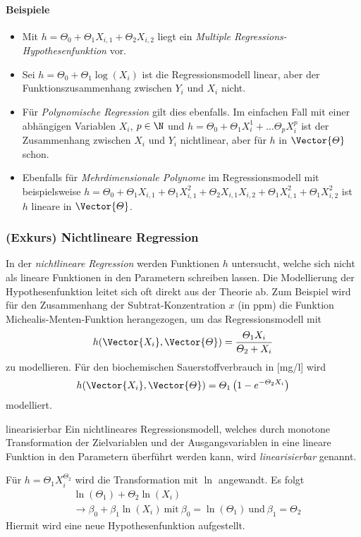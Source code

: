 \paragraph{Beispiele} 
\begin{itemize}
	\item Mit $h = \varTheta_0 + \varTheta_1X_{i,1} + \varTheta_2X_{i,2}$ liegt ein \textit{Multiple Regressions-Hypothesenfunktion} vor.
	\item Sei $h= \varTheta_0 + \varTheta_1\log(X_i)$ ist die Regressionsmodell linear, aber der Funktionszusammenhang zwischen $Y_i$ und $X_i$ nicht.
	\item Für \textit{Polynomische Regression} gilt dies ebenfalls. Im einfachen Fall mit einer abhängigen Variablen $X_i$, $p\in \N$ und $h= \varTheta_0 + \varTheta_1X_i^1+\dots \varTheta_pX_i^p$ ist der Zusammenhang zwischen $X_i$ und $Y_i$ nichtlinear, aber für $h$ in $\Vector{\varTheta}$ schon.
	\item  Ebenfalls für \textit{Mehrdimensionale Polynome} im Regressionsmodell mit beispielsweise
	$h=\varTheta_0 + \varTheta_1X_{i,1} +\varTheta_1X_{i,1}^2 +\varTheta_2X_{i,1}X_{i,2} +\varTheta_1X_{i,1}^2  +\varTheta_1X_{i,2}^2$ ist $h$ lineare in $\Vector{\varTheta}$. 
\end{itemize} 

\subsubsection{(Exkurs) Nichtlineare Regression}
In der \textit{nichtlineare Regression} werden Funktionen $h$ untersucht, welche sich nicht als lineare Funktionen in den Parametern schreiben lassen. Die Modellierung der Hypothesenfunktion leitet sich oft direkt aus der Theorie ab. Zum Beispiel wird für den Zusammenhang der Subtrat-Konzentration $x$ (in ppm) die Funktion Michealis-Menten-Funktion herangezogen, um das Regressionsmodell mit 
\begin{align}
	h(\Vector{X_i}, \Vector{\varTheta})= \frac{\varTheta_1 X_i}{\varTheta_2 + X_i}
\end{align}
zu modellieren. Für den biochemischen Sauerstoffverbrauch in [mg/l] wird 
\begin{align}
	h(\Vector{X_i}, \Vector{\varTheta})= \varTheta_1\left(1-e^{-\varTheta_2X_i}\right)
\end{align} modelliert.\\

\begin{Definition}{linearisierbar}
	Ein nichtlineares Regressionsmodell, welches durch monotone Transformation der Zielvariablen und der Ausgangsvariablen in eine lineare Funktion in den Parametern überführt werden kann, wird \textit{linearisierbar} genannt.
\end{Definition}
Für $h=\varTheta_1X_i^{\varTheta_2}$ wird die Transformation mit $\ln$ angewandt. Es folgt
\begin{align}
	&\ln(\varTheta_1) + \varTheta_2\ln(X_i)\\
	&\rightarrow \beta_0 + \beta_1 \ln(X_i)\:\text{mit}\: \beta_0 =\ln(\varTheta_1)\:\text{und}\: \beta_1=\varTheta_2
\end{align} 
Hiermit wird eine neue Hypothesenfunktion aufgestellt.

